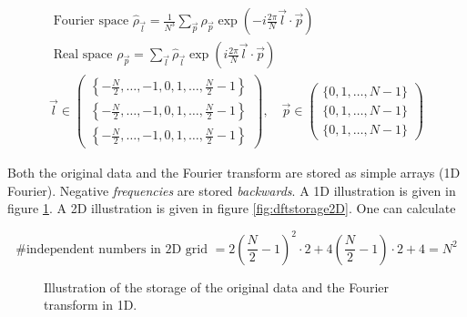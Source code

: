 \begin{equation}
    \boxed{
    \begin{gathered}
    \text { Fourier space } \hat{\rho}_{\vec{l}}=\frac{1}{N^3} \sum_{\vec{p}} \rho_{\vec{p}} \exp \left(-i \frac{2 \pi}{N} \vec{l} \cdot \vec{p}\right) \\
    \text { Real space } \rho_{\vec{p}}=\sum_{\vec{l}} \hat{\rho}_{\vec{l}} \exp \left(i \frac{2 \pi}{N} \vec{l} \cdot \vec{p}\right) \\
    \vec{l}\in\left(\begin{array}{l}
        \left\{-\frac{N}{2}, \ldots,-1,0,1, \ldots, \frac{N}{2}-1\right\} \\
        \left\{-\frac{N}{2}, \ldots,-1,0,1, \ldots, \frac{N}{2}-1\right\} \\
        \left\{-\frac{N}{2}, \ldots,-1,0,1, \ldots, \frac{N}{2}-1\right\}
    \end{array}\right), \quad \vec{p} \in \left(\begin{array}{l}
        \{0,1, \ldots, N-1\} \\
        \{0,1, \ldots, N-1\} \\
        \{0,1, \ldots, N-1\}
        \end{array}\right)
    \end{gathered}
    }
\end{equation}

Both the original data and the Fourier transform are stored as simple arrays (1D Fourier).
Negative \textit{frequencies} are stored \textit{backwards}. A 1D illustration is given 
in figure \ref{fig:dftstorage1D}. A 2D illustration is given in figure \ref{fig:dftstorage2D}.
One can calculate

\begin{equation}
    \text{\# independent numbers in 2D grid } = 2\left(\frac{N}{2}-1\right)^2 \cdot 2+4\left(\frac{N}{2}-1\right) \cdot 2+4=N^2
\end{equation}

\begin{figure}[ht]
    \centering
    
    \caption{Illustration of the storage of the original data and the Fourier transform
    in 1D.}
    \label{fig:dftstorage1D}
\end{figure}

